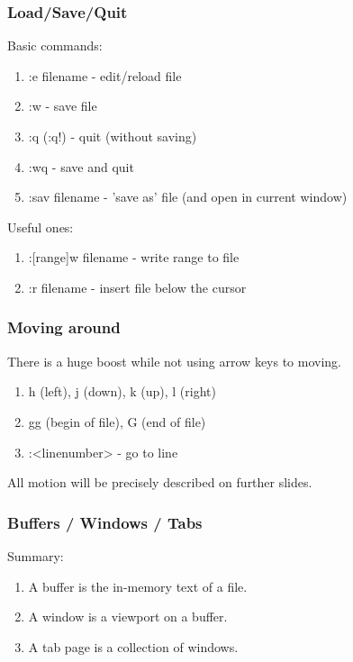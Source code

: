 \documentclass{beamer}
\begin{document}
\begin{frame}
  \frametitle{Load/Save/Quit}
  Basic commands:
  \begin{enumerate}
    \item :e filename - edit/reload file
    \item :w - save file
    \item :q (:q!) - quit (without saving)
    \item :wq - save and quit
    \item :sav filename - 'save as' file (and open in current window)
  \end{enumerate}

  Useful ones:
  \begin{enumerate}
    \item :[range]w filename - write range to file
    \item :r filename - insert file below the cursor
  \end{enumerate}
\end{frame}

\begin{frame}
  \frametitle{Moving around}
  There is a huge boost while not using arrow keys to moving.
  \begin{enumerate}
    \item h (left), j (down), k (up), l (right) \\
    \item gg (begin of file), G (end of file) \\
    \item :<linenumber> - go to line
  \end{enumerate}
  All motion will be precisely described on further slides.
\end{frame}

\begin{frame}
  \frametitle{Buffers / Windows / Tabs}
  Summary:
  \begin{enumerate}
    \item A buffer is the in-memory text of a file.
    \item A window is a viewport on a buffer.
    \item A tab page is a collection of windows.
  \end{enumerate}
\end{frame}
\end{document}
